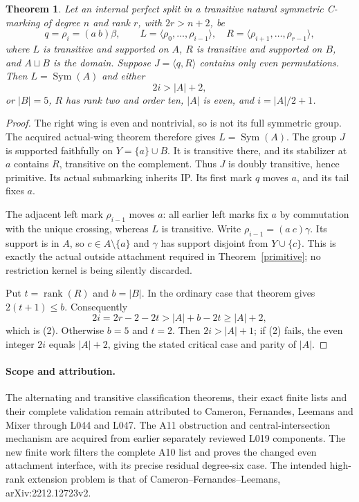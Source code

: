 \documentclass[11pt,a4paper]{article}
\newtheorem{theorem}[lemma]{Theorem}
\newcommand{\gen}[1]{\langle#1\rangle}
\newcommand{\Sym}{\operatorname{Sym}}
\begin{document}
\begin{theorem}\label{descent}
Let an internal perfect split in a transitive natural symmetric
C-marking of degree $n$ and rank $r$, with $2r>n+2$, be
\[
 q=\rho_i=(a\ b)\beta,\qquad
 L=\gen{\rho_0,\ldots,\rho_{i-1}},\quad
 R=\gen{\rho_{i+1},\ldots,\rho_{r-1}},
\]
where $L$ is transitive and supported on $A$, $R$ is transitive
and supported on $B$, and $A\sqcup B$ is the domain. Suppose
$J=\gen{q,R}$ contains only even permutations. Then
$L=\Sym(A)$ and either
\[
                         2i>|A|+2,                  \tag{2}
\]
or $|B|=5$, $R$ has rank two and order ten, $|A|$ is even,
and $i=|A|/2+1$.
\end{theorem}
\begin{proof}
The right wing is even and nontrivial, so is not its full symmetric
group. The acquired actual-wing theorem therefore gives
$L=\Sym(A)$. The group $J$ is supported faithfully on
$Y=\{a\}\cup B$. It is transitive there, and its stabilizer at
$a$ contains $R$, transitive on the complement. Thus $J$ is doubly
transitive, hence primitive. Its actual submarking inherits IP.
Its first mark $q$ moves $a$, and its tail fixes $a$.

The adjacent left mark $\rho_{i-1}$ moves $a$: all earlier left
marks fix $a$ by commutation with the unique crossing, whereas
$L$ is transitive. Write $\rho_{i-1}=(a\ c)\gamma$. Its support
is in $A$, so $c\in A\setminus\{a\}$ and $\gamma$ has support
disjoint from $Y\cup\{c\}$. This is exactly the actual outside
attachment required in Theorem~\ref{primitive}; no restriction
kernel is being silently discarded.

Put $t=\operatorname{rank}(R)$ and $b=|B|$.
In the ordinary case that theorem gives $2(t+1)\le b$.
Consequently
\[
  2i=2r-2-2t>|A|+b-2t\ge|A|+2,
\]
which is (2). Otherwise $b=5$ and $t=2$. Then
$2i>|A|+1$; if (2) fails, the even integer $2i$ equals
$|A|+2$, giving the stated critical case and parity of $|A|$.
\end{proof}

\paragraph{Scope and attribution.}
The alternating and transitive classification theorems, their exact
finite lists and their complete validation remain attributed to
Cameron, Fernandes, Leemans and Mixer through L044 and L047. The
A11 obstruction and central-intersection mechanism are acquired
from earlier separately reviewed L019 components. The new finite
work filters the complete A10 list and proves the changed even
attachment interface, with its precise residual degree-six case.
The intended high-rank extension problem is that of
Cameron--Fernandes--Leemans, arXiv:2212.12723v2.
\end{document}
